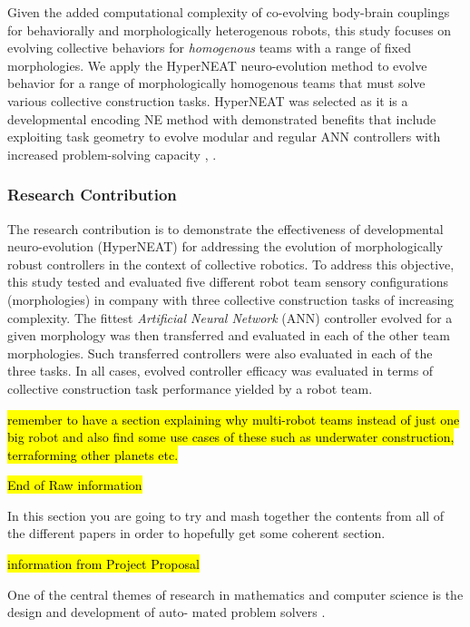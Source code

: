 \documentclass[conference]{IEEEtran}
\DeclareRobustCommand{\hlcyan}[1]{{\sethlcolor{cyan}\hl{#1}}}
\begin{document}
Given the added computational complexity of co-evolving body-brain couplings
for behaviorally and morphologically heterogenous robots,
this study focuses on evolving collective behaviors for \textit{homogenous} teams with a range of fixed morphologies.
We apply the HyperNEAT \cite{StanleyDAmbrosioGauci2009} neuro-evolution method to evolve
behavior for a range of morphologically homogenous teams that must solve various collective construction tasks.
HyperNEAT was selected as it is a developmental encoding NE method with demonstrated benefits
that include exploiting task geometry to evolve modular and regular ANN controllers with
increased problem-solving capacity \cite{VerbancsicsStanley2011}, \cite{DAmbrosio2013}.

\subsubsection{Research Contribution}

The research contribution is to demonstrate the effectiveness of developmental neuro-evolution (HyperNEAT) for
addressing the evolution of morphologically robust controllers in the context of collective robotics.
To address this objective, this study tested and evaluated five different robot team sensory configurations
(morphologies) in company with three collective construction tasks of increasing complexity.  The fittest
\textit{Artificial Neural Network} (ANN) controller evolved for a given morphology was then transferred and
evaluated in each of the other team morphologies.  Such transferred controllers were also evaluated in
each of the three tasks.  In all cases, evolved controller efficacy was evaluated in terms of
collective construction task performance yielded by a robot team.

\hlcyan{remember to have a section explaining why multi-robot teams instead of just one big robot and also find some use cases of these such as underwater construction, terraforming other planets etc.}

\hl{End of Raw information}

In this section you are going to try and mash together the contents from all of the different papers in order to hopefully get some coherent section.

\hl{information from Project Proposal}

One of the central themes of research in mathematics and
computer science is the design and development of auto-
mated problem solvers \cite{EibenSmith2003}.
\end{document}
